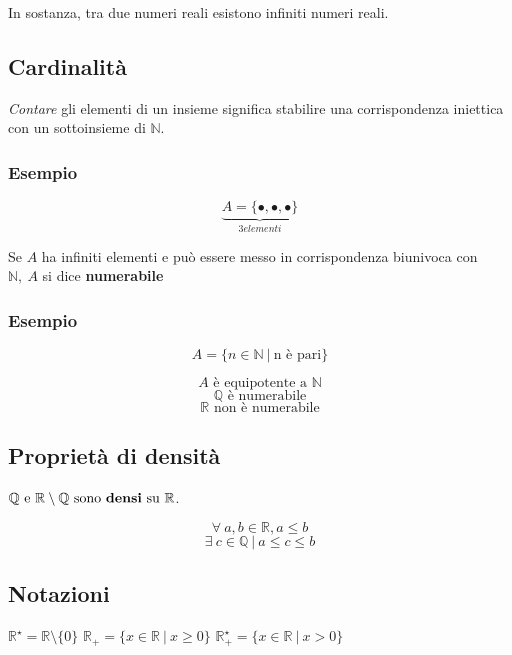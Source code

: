 \begin{itemize}
            In sostanza, tra due numeri reali esistono infiniti numeri reali.
    \end{itemize}
\subsection{Cardinalità}
\textit{Contare} gli elementi di un insieme significa stabilire una corrispondenza iniettica con un sottoinsieme di $\mathbb{N}$.

\subsubsection*{Esempio}
\begin{Large}
    \[
        \underbrace{A = \{\bullet,\bullet,\bullet\}}_{3 elementi}
    \]
\end{Large}
Se $A$ ha infiniti elementi e può essere messo in corrispondenza biunivoca con $\mathbb{N},\ A$ si dice \textbf{numerabile}
\subsubsection*{Esempio}
    \begin{Large}
    \[A = \{n \in \mathbb{N}\ |\ \text{n è pari} \}\] \newline
    \end{Large}
    \[A \text{ è equipotente a }\mathbb{N}\]
    \[\mathbb{Q} \text{ è numerabile}\]
    \[\mathbb{R} \text{ non è numerabile}\]
\subsection{Proprietà di densità}
    $\mathbb{Q} \text{ e } \mathbb{R} \setminus \mathbb{Q} \text{ sono \textbf{densi} su }\mathbb{R}$.
    \begin{Large}
        \begin{equation*}
            \forall\ a,b \in \mathbb{R},a \le b
        \end{equation*}
        \begin{equation*}
            \exists\ c \in \mathbb{Q}\ |\ a \le c \le b 
        \end{equation*}
    \end{Large}
\subsection{Notazioni}
\begin{Large}
    $\mathbb{R}^{\star} = \mathbb{R} \setminus \{0\}$\newline
    $\mathbb{R}_{+} = \{x \in \mathbb{R}\ |\ x \geq 0\}$\newline
    $\mathbb{R}_{+}^{\star} = \{x \in \mathbb{R}\ |\ x > 0\}$
\end{Large}
